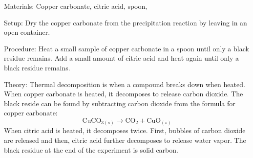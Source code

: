 \begin{multicols}{2}
\begin{description*}
\item[Materials:]{Copper carbonate, citric acid, spoon, }
\item[Setup:]{Dry the copper carbonate from the precipitation reaction by leaving in an open container.}
\item[Procedure:]{Heat a small sample of copper carbonate in a spoon until only a black residue remains. Add a small amount of citric acid and heat again until only a black residue remains.}
\item[Theory:]{Thermal decomposition is when a compound breaks down when heated. When copper carbonate is heated, it decomposes to release carbon dioxide. The black reside can be found by subtracting carbon dioxide from the formula for copper carbonate:
\[ \mathrm{Cu}\mathrm{CO}_{3(s)} \longrightarrow \mathrm{CO}_2 + \mathrm{CuO}_{(s)} \]
When citric acid is heated, it decomposes twice. First, bubbles of carbon
dioxide are released and then, citric acid further decomposes to release water
vapor. The black residue at the end of the experiment is solid carbon.}
\end{description*}



\end{multicols}

\pagebreak